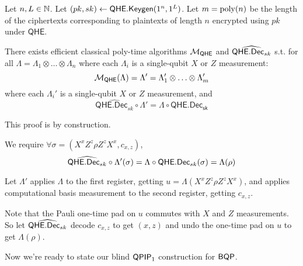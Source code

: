 \begin{thm}
	\label{decodeMeasureOrder}
	Let $n, L\in\mathbb{N}$.
	Let $(pk, sk)\leftarrow\mathsf{QHE.Keygen}(1^n, 1^L)$.
	Let $m=\operatorname*{\operatorname{poly}}(n)$ be the length of the ciphertexts corresponding to plaintexts of length $n$ encrypted using $pk$ under $\mathsf{QHE}$.
	
	There exists efficient classical poly-time algorithms ${\cal M}_{\mathsf{QHE}}$ and $\widehat{\mathsf{QHE.Dec}_{sk}}$ s.t.
	for all $\Lambda=\Lambda_1\otimes\ldots\otimes\Lambda_n$ where each $\Lambda_i$ is a single-qubit $X$ or $Z$ measurement: 
	$${\cal M}_{\mathsf{QHE}}(\Lambda)=\Lambda'=\Lambda'_1\otimes\ldots\otimes\Lambda'_m$$
	where each $\Lambda_i'$ is a single-qubit $X$ or $Z$ measurement, and 
	$$\widehat{\mathsf{QHE.Dec}_{sk}}\circ\Lambda'=\Lambda\circ\mathsf{QHE.Dec_{sk}}$$
\end{thm}
\begin{prf}
	This proof is by construction.

	We require $\forall\sigma=(X^xZ^z\rho Z^zX^x, c_{x,z})$,
	$$\widehat{\mathsf{QHE.Dec}_{sk}}\circ\Lambda'(\sigma)=\Lambda\circ\mathsf{QHE.Dec}_{sk}(\sigma)=\Lambda(\rho)$$
	
	Let $\Lambda'$ applies $\Lambda$ to the first register, getting $u=\Lambda(X^xZ^z\rho Z^zX^x)$, and applies computational basis measurement to the second register, getting $c_{x, z}$.

	Note that the Pauli one-time pad on $u$ commutes with $X$ and $Z$ measurements.
	So let $\widehat{\mathsf{QHE.Dec}_{sk}}$ decode $c_{x, z}$ to get $(x, z)$ and undo the one-time pad on $u$ to get $\Lambda(\rho)$.
\end{prf}

Now we're ready to state our blind $\operatorname{\mathsf{QPIP}}_1$ construction for $\operatorname{\mathsf{BQP}}$.

